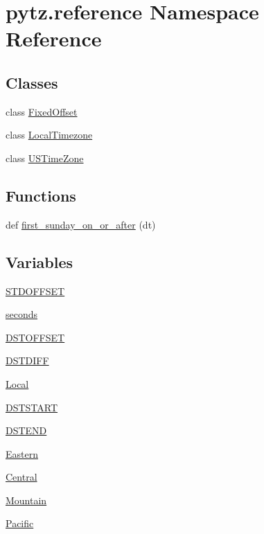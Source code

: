 \hypertarget{namespacepytz_1_1reference}{}\section{pytz.\+reference Namespace Reference}
\label{namespacepytz_1_1reference}
\subsection*{Classes}
\begin{DoxyCompactItemize}
\item 
class \hyperlink{classpytz_1_1reference_1_1FixedOffset}{Fixed\+Offset}
\item 
class \hyperlink{classpytz_1_1reference_1_1LocalTimezone}{Local\+Timezone}
\item 
class \hyperlink{classpytz_1_1reference_1_1USTimeZone}{U\+S\+Time\+Zone}
\end{DoxyCompactItemize}
\subsection*{Functions}
\begin{DoxyCompactItemize}
\item 
def \hyperlink{namespacepytz_1_1reference_ac80b6aa380325afc4c9052303580cb02}{first\+\_\+sunday\+\_\+on\+\_\+or\+\_\+after} (dt)
\end{DoxyCompactItemize}
\subsection*{Variables}
\begin{DoxyCompactItemize}
\item 
\hyperlink{namespacepytz_1_1reference_a54ca1e3402b61d051a99ec0c8871e40d}{S\+T\+D\+O\+F\+F\+S\+ET}
\item 
\hyperlink{namespacepytz_1_1reference_a66a346483263bdb9169bf32fa2932869}{seconds}
\item 
\hyperlink{namespacepytz_1_1reference_a062e39b1194fb05a32cda232862c57d0}{D\+S\+T\+O\+F\+F\+S\+ET}
\item 
\hyperlink{namespacepytz_1_1reference_ac0b06133f0adeb56b6b1774b1270855b}{D\+S\+T\+D\+I\+FF}
\item 
\hyperlink{namespacepytz_1_1reference_a422b1da8a1a7ad49b80a1f2c4a8e0117}{Local}
\item 
\hyperlink{namespacepytz_1_1reference_a1655c724e110ba032b3459872e1a249f}{D\+S\+T\+S\+T\+A\+RT}
\item 
\hyperlink{namespacepytz_1_1reference_a69710670d0725a857016a5377464e775}{D\+S\+T\+E\+ND}
\item 
\hyperlink{namespacepytz_1_1reference_ace6026fa056147f306e3989cf17e4e64}{Eastern}
\item 
\hyperlink{namespacepytz_1_1reference_afa66b887c50c4d73210b805cadd4b8f0}{Central}
\item 
\hyperlink{namespacepytz_1_1reference_a3ffbdc38bd14f361c0ed4510c9769739}{Mountain}
\item 
\hyperlink{namespacepytz_1_1reference_aaf642fe1899ee8a2143d773bdda35cb8}{Pacific}
\end{DoxyCompactItemize}


